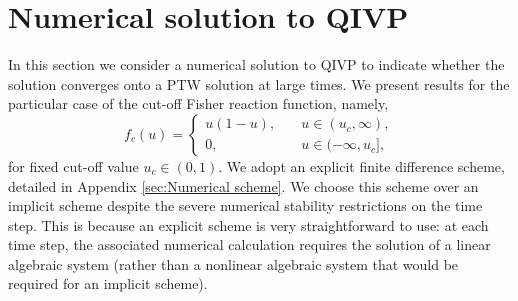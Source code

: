 \documentclass[11pt,a4paper]{article}
\newcommand{\eelab}[1]{\label{eqn:#1}}
\newcommand{\ssref}[1]{\ref{sec:#1}}
\newcommand{\sslab}[1]{\label{sec:#1}}
\def\beq{\begin{equation}}
\def\eeq{\end{equation}}
\begin{document}
  
\section{Numerical solution to QIVP}   \sslab{Numerical_results} 

  
 In this section we consider a numerical solution to QIVP to indicate whether the solution converges onto a PTW solution at large times. 
 We present results for the particular case of the cut-off Fisher reaction function, namely,
 \beq \eelab{cutoff_Fisher}
 f_c(u) = \begin{cases}  u(1-u), \quad & u \in (u_c, \infty) ,     \\
   0, \quad &  u \in (- \infty, u_c],  \end{cases}  
 \eeq
 for fixed cut-off value $u_c \in (0,1)$.
  We adopt an explicit  finite difference scheme, detailed in  Appendix \ssref{Numerical scheme}. 
  We choose this scheme over an implicit scheme despite the severe numerical  stability restrictions on the time step. This is because an explicit scheme is very straightforward to use: at each time step, the  associated numerical calculation
  requires the solution of a linear algebraic system 
  (rather than a nonlinear algebraic system that would be required for an implicit scheme).  
  
 
\end{document}
